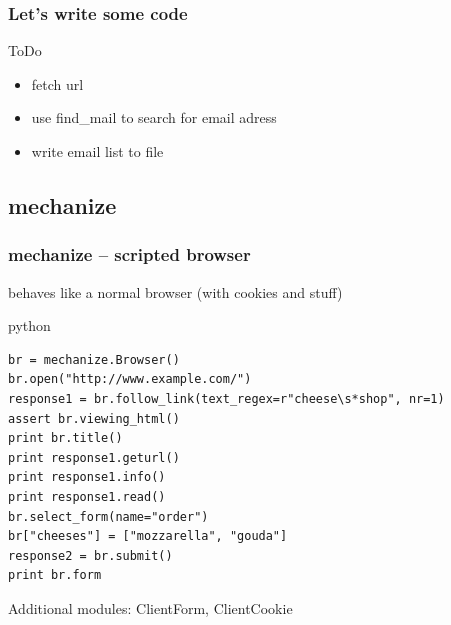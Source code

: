 \documentclass{beamer}
\begin{document}
\begin{frame}
	\frametitle{Let's write some code}
	\begin{block}{ToDo}
	\begin{itemize}
		\item fetch url
		\item use find\_mail to search for email adress
		\item write email list to file
	\end{itemize}
	\end{block}
\end{frame}


\subsection*{mechanize} %
\begin{frame}[fragile]
	\frametitle{mechanize -- scripted browser}
	behaves like a normal browser (with cookies and stuff)
	\begin{exampleblock}{python}
	\begin{lstlisting}
br = mechanize.Browser()
br.open("http://www.example.com/")
response1 = br.follow_link(text_regex=r"cheese\s*shop", nr=1)
assert br.viewing_html()
print br.title()
print response1.geturl()
print response1.info()
print response1.read()
br.select_form(name="order")
br["cheeses"] = ["mozzarella", "gouda"]
response2 = br.submit()
print br.form
	\end{lstlisting}
	\end{exampleblock}
	Additional modules: ClientForm, ClientCookie
\end{frame}
\end{document}
